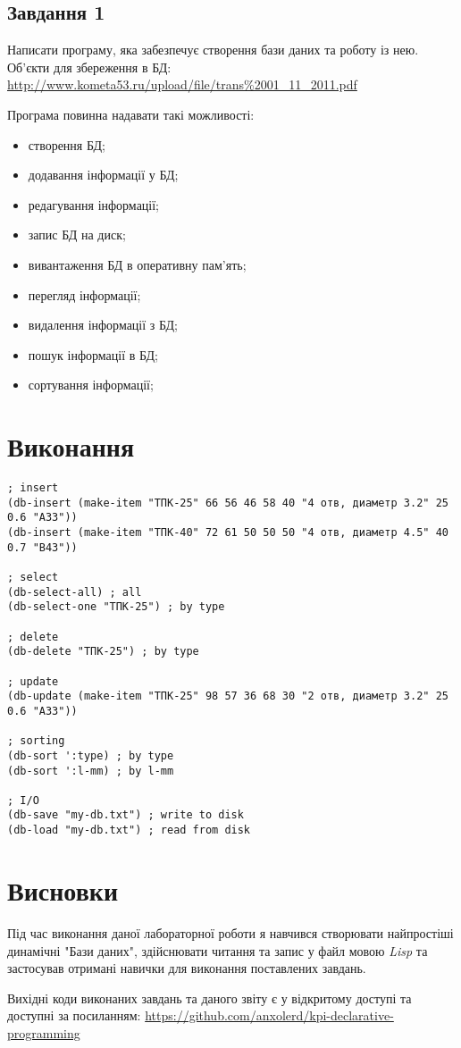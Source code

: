 \documentclass[a4paper, 12pt]{extarticle}
\begin{document}
\subsection{Завдання 1}
Написати програму, яка забезпечує створення бази даних та роботу із нею.
Об'єкти для збереження в БД: \url{http://www.kometa53.ru/upload/file/trans\%2001_11_2011.pdf}

Програма повинна надавати такі можливості:
\begin{itemize}
  \item створення БД;
  \item додавання інформації у БД;
  \item редагування інформації;
  \item запис БД на диск;
  \item вивантаження БД в оперативну пам'ять;
  \item перегляд інформації;
  \item видалення інформації з БД;
  \item пошук інформації в БД;
  \item сортування інформації;
\end{itemize}

\section{Виконання}

\begin{lstlisting}
; insert
(db-insert (make-item "ТПК-25" 66 56 46 58 40 "4 отв, диаметр 3.2" 25 0.6 "А33"))
(db-insert (make-item "ТПК-40" 72 61 50 50 50 "4 отв, диаметр 4.5" 40 0.7 "В43"))

; select
(db-select-all) ; all
(db-select-one "ТПК-25") ; by type

; delete
(db-delete "ТПК-25") ; by type

; update
(db-update (make-item "ТПК-25" 98 57 36 68 30 "2 отв, диаметр 3.2" 25 0.6 "А33"))

; sorting
(db-sort ':type) ; by type
(db-sort ':l-mm) ; by l-mm

; I/O
(db-save "my-db.txt") ; write to disk
(db-load "my-db.txt") ; read from disk
\end{lstlisting}

\section{Висновки}

Під час виконання даної лабораторної роботи я навчився створювати найпростіші динамічні "Бази даних", здійснювати читання та запис у файл мовою \textit{Lisp} та застосував отримані навички для виконання поставлених завдань.

Вихідні коди виконаних завдань та даного звіту є у відкритому доступі та доступні за посиланням: \url{https://github.com/anxolerd/kpi-declarative-programming}
\end{document}
